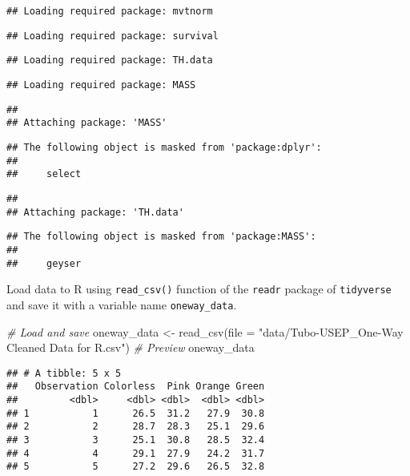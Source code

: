 \documentclass[
]{book}
\newenvironment{Shaded}{\begin{snugshade}}{\end{snugshade}}
\newcommand{\AttributeTok}[1]{\textcolor[rgb]{0.77,0.63,0.00}{#1}}
\newcommand{\CommentTok}[1]{\textcolor[rgb]{0.56,0.35,0.01}{\textit{#1}}}
\newcommand{\FunctionTok}[1]{\textcolor[rgb]{0.00,0.00,0.00}{#1}}
\newcommand{\NormalTok}[1]{#1}
\newcommand{\OtherTok}[1]{\textcolor[rgb]{0.56,0.35,0.01}{#1}}
\newcommand{\StringTok}[1]{\textcolor[rgb]{0.31,0.60,0.02}{#1}}
\begin{document}
\begin{verbatim}
## Loading required package: mvtnorm
\end{verbatim}

\begin{verbatim}
## Loading required package: survival
\end{verbatim}

\begin{verbatim}
## Loading required package: TH.data
\end{verbatim}

\begin{verbatim}
## Loading required package: MASS
\end{verbatim}

\begin{verbatim}
## 
## Attaching package: 'MASS'
\end{verbatim}

\begin{verbatim}
## The following object is masked from 'package:dplyr':
## 
##     select
\end{verbatim}

\begin{verbatim}
## 
## Attaching package: 'TH.data'
\end{verbatim}

\begin{verbatim}
## The following object is masked from 'package:MASS':
## 
##     geyser
\end{verbatim}

Load data to R using \texttt{read\_csv()} function of the \texttt{readr} package of \texttt{tidyverse} and save it with a variable name \texttt{oneway\_data}.

\begin{Shaded}
\begin{Highlighting}[]
\CommentTok{\# Load and save}
\NormalTok{oneway\_data }\OtherTok{\textless{}{-}} \FunctionTok{read\_csv}\NormalTok{(}\AttributeTok{file =} \StringTok{"data/Tubo{-}USEP\_One{-}Way Cleaned Data for R.csv"}\NormalTok{)}
\CommentTok{\# Preview}
\NormalTok{oneway\_data}
\end{Highlighting}
\end{Shaded}

\begin{verbatim}
## # A tibble: 5 x 5
##   Observation Colorless  Pink Orange Green
##         <dbl>     <dbl> <dbl>  <dbl> <dbl>
## 1           1      26.5  31.2   27.9  30.8
## 2           2      28.7  28.3   25.1  29.6
## 3           3      25.1  30.8   28.5  32.4
## 4           4      29.1  27.9   24.2  31.7
## 5           5      27.2  29.6   26.5  32.8
\end{verbatim}
\end{document}
